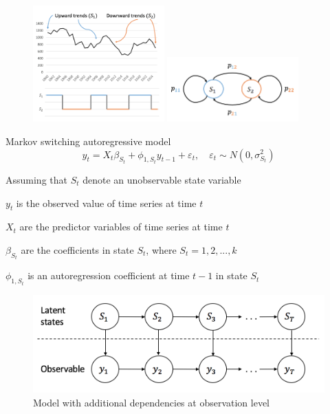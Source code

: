 \documentclass{beamer}
\begin{document}
\begin{frame}[fragile]
\begin{figure}
	\includegraphics[width=0.45\textwidth]{msm-ex}
	\hspace{0.1cm}
	\includegraphics[width=0.45\textwidth]{transition1}
\end{figure}

\end{frame}

\begin{frame}

\begin{block}{Markov switching autoregressive model}
\[
y_{t} = X_{t}\beta_{S_{t}} + \phi_{1,S_{t}} y_{t-1} + \varepsilon_{t}, \quad \varepsilon_{t} \sim N(0,\sigma^{2}_{S_{t}})
\]
\end{block}

Assuming that $S_{t}$ denote an unobservable state variable

$y_{t}$ is the observed value of time series at time $t$ 

$X_{t}$ are the predictor variables of time series at time $t$ 

$\beta_{S_{t}}$ are the coefficients in state $S_{t}$, where $S_{t}=1,2,...,k$

$\phi_{1,S_{t}}$ is an autoregression coefficient at time $t-1$ in state $S_{t}$

\begin{figure}
	\includegraphics[width=0.6\linewidth]{msm-ar1}
	\caption{Model with additional dependencies at observation level}
\end{figure}

\end{frame}
\end{document}
